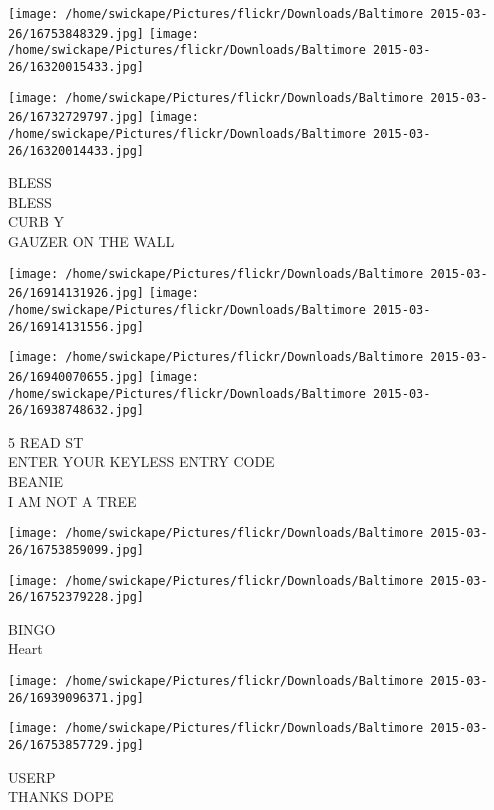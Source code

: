 \documentclass[10pt,letterpaper]{article}
\begin{document}
\texttt{[image: /home/swickape/Pictures/flickr/Downloads/Baltimore 2015-03-26/16753848329.jpg]}
\texttt{[image: /home/swickape/Pictures/flickr/Downloads/Baltimore 2015-03-26/16320015433.jpg]}

\texttt{[image: /home/swickape/Pictures/flickr/Downloads/Baltimore 2015-03-26/16732729797.jpg]}
\texttt{[image: /home/swickape/Pictures/flickr/Downloads/Baltimore 2015-03-26/16320014433.jpg]}

BLESS\\
BLESS\\
CURB Y\\
GAUZER ON THE WALL\\
\pagebreak

\texttt{[image: /home/swickape/Pictures/flickr/Downloads/Baltimore 2015-03-26/16914131926.jpg]}
\texttt{[image: /home/swickape/Pictures/flickr/Downloads/Baltimore 2015-03-26/16914131556.jpg]}

\texttt{[image: /home/swickape/Pictures/flickr/Downloads/Baltimore 2015-03-26/16940070655.jpg]}
\texttt{[image: /home/swickape/Pictures/flickr/Downloads/Baltimore 2015-03-26/16938748632.jpg]}

5 READ ST\\
ENTER YOUR KEYLESS ENTRY CODE\\
BEANIE\\
I AM NOT A TREE\\
\pagebreak

\texttt{[image: /home/swickape/Pictures/flickr/Downloads/Baltimore 2015-03-26/16753859099.jpg]}

\vspace{0.25in}
\texttt{[image: /home/swickape/Pictures/flickr/Downloads/Baltimore 2015-03-26/16752379228.jpg]}

BINGO\\
Heart\\
\pagebreak

\texttt{[image: /home/swickape/Pictures/flickr/Downloads/Baltimore 2015-03-26/16939096371.jpg]}

\vspace{0.25in}
\texttt{[image: /home/swickape/Pictures/flickr/Downloads/Baltimore 2015-03-26/16753857729.jpg]}

USERP\\
THANKS DOPE\\
\pagebreak
\end{document}
